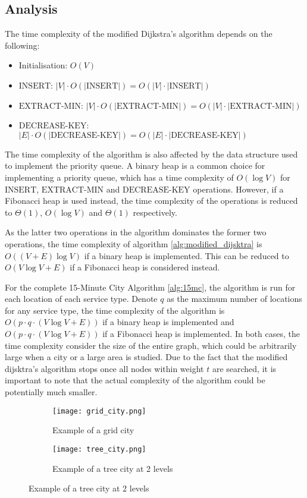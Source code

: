 \subsection{Analysis}

The time complexity of the modified Dijkstra's algorithm depends on the following:

\begin{itemize}
    \item Initialisation: $O(V)$
    \item $\text{INSERT}$: $|V|\cdot O(|\text{INSERT}|)=O(|V|\cdot|\text{INSERT}|)$
    \item $\text{EXTRACT-MIN}$: $|V|\cdot O(|\text{EXTRACT-MIN}|)=O(|V|\cdot|\text{EXTRACT-MIN}|)$
    \item $\text{DECREASE-KEY}$: $|E|\cdot O(|\text{DECREASE-KEY}|)=O(|E|\cdot|\text{DECREASE-KEY}|)$
\end{itemize}

The time complexity of the algorithm is also affected by the data structure used to implement the priority queue. A binary heap is a common choice for implementing a priority queue, which has a time complexity of $O(\log V)$ for $\text{INSERT}$, $\text{EXTRACT-MIN}$ and $\text{DECREASE-KEY}$ operations. However, if a Fibonacci heap is used instead, the time complexity of the operations is reduced to $\Theta(1)$, $O(\log V)$ and $\Theta(1)$ respectively.

As the latter two operations in the algorithm dominates the former two operations, the time complexity of algorithm \ref{alg:modified_dijsktra} is $O((V+E)\log V)$ if a binary heap is implemented. This can be reduced to $O(V\log V+E)$ if a Fibonacci heap is considered instead.

For the complete 15-Minute City Algorithm \ref{alg:15mc}, the algorithm is run for each location of each service type. Denote $q$ as the maximum number of locations for any service type, the time complexity of the algorithm is $O(p\cdot q\cdot(V\log V+E))$ if a binary heap is implemented and $O(p\cdot q\cdot(V\log V+E))$ if a Fibonacci heap is implemented. In both cases, the time complexity consider the size of the entire graph, which could be arbitrarily large when a city or a large area is studied. Due to the fact that the modified dijsktra's algorithm stops once all nodes within weight $t$ are searched, it is important to note that the actual complexity of the algorithm could be potentially much smaller.

\begin{figure}[H]
    \centering
    \begin{subfigure}{0.5\textwidth}
        \centering
        \texttt{[image: grid\_city.png]}
        \caption{Example of a grid city}
        \label{fig:grid_city}
    \end{subfigure}\hfill
    \begin{subfigure}{0.5\textwidth}
        \centering
        \texttt{[image: tree\_city.png]}
        \caption{Example of a tree city at 2 levels}
        \label{fig:tree_city}
    \end{subfigure}
\end{figure}

